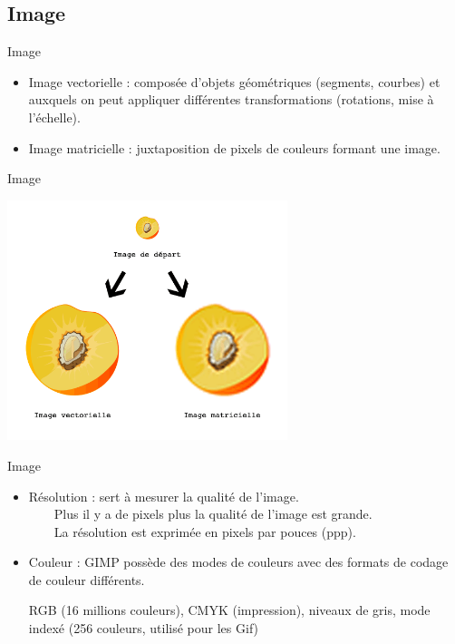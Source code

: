 \documentclass[xcolor=x11names,compress]{beamer}
\renewcommand{\(}{\begin{columns}}
\renewcommand{\)}{\end{columns}}
\newcommand{\<}[1]{\begin{column}{#1}}
\renewcommand{\>}{\end{column}}
\begin{document}
\subsection{Image}
\begin{frame}{Image}
\begin{itemize}
\item Image vectorielle : 
composée d'objets géométriques (segments, courbes) et auxquels on peut appliquer différentes transformations (rotations, mise à l'échelle).
\end{itemize}
\begin{itemize}
\item Image matricielle : juxtaposition de pixels de couleurs formant une image.
\end{itemize}
\end{frame}
\begin{frame}{Image}
\begin{center}
	\includegraphics[height=7cm]{vecteur-vs-matricielle}
	\end{center}
\end{frame}
\begin{frame}{Image}
\begin{itemize}
\item Résolution : sert à mesurer la qualité de l’image.\\
~~~~Plus il y a de pixels plus la qualité de l'image est grande.\\
~~~~La résolution est exprimée en pixels par pouces (ppp).
\end{itemize}
\begin{itemize}
\item Couleur : GIMP possède des modes de couleurs avec des formats de codage de couleur différents. 
\\
\begin{text}
RGB (16 millions couleurs), CMYK (impression), niveaux de gris, mode indexé (256 couleurs, utilisé pour les Gif)
\end{text}
\end{itemize}
\end{frame}
\end{document}
